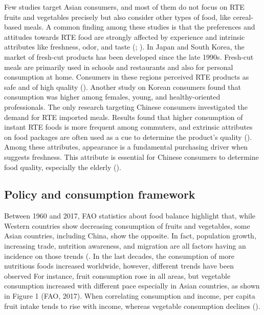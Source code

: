 \documentclass[a4,12pt]{article}
\begin{document}
Few studies target Asian consumers, and most of them do not focus on RTE fruits and vegetables precisely but also consider other types of food, like cereal-based meals.  A common finding among these studies is that the preferences and attitudes towards RTE food are strongly affected by experience and intrinsic attributes like freshness, odor, and taste (\cite{Kwon18}; \cite{Thienhirun18}). In Japan and South Korea, the market of fresh-cut products has been developed since the late 1990s. Fresh-cut meals are primarily used in schools and restaurants and also for personal consumption at home. Consumers in these regions perceived RTE products as safe and of high quality (\cite{Kim07}). Another study on Korean consumers found that consumption was higher among females, young, and healthy-oriented professionals. The only research targeting Chinese consumers investigated the demand for RTE imported meals. Results found that higher consumption of instant RTE foods is more frequent among commuters, and extrinsic attributes on food packages are often used as a cue to determine the product's quality (\cite{Lilavanichakul18}). Among these attributes, appearance is a fundamental purchasing driver when suggests freshness. This attribute is essential for Chinese consumers to determine food quality, especially the elderly (\cite{Hansstein17}).

\subsection{Policy and consumption framework}

Between 1960 and 2017, FAO statistics about food balance highlight that, while Western countries show decreasing consumption of fruits and vegetables, some Asian countries, including China, show the opposite. In fact, population growth, increasing trade, nutrition awareness, and migration are all factors having an incidence on those trends (\cite{FAO17}. In the last decades, the consumption of more nutritious foods increased worldwide, however, different trends have been observed For instance, fruit consumption rose in all areas, but vegetable consumption increased with different pace especially in Asian countries, as shown in Figure 1 (FAO, 2017). When correlating consumption and income, per capita fruit intake tends to rise with income, whereas vegetable consumption declines (\cite{FAO17}).
\end{document}

